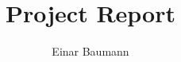 



\author{Einar Baumann}
\title{Project Report}



\maketitle

\clearpage
\tableofcontents

\clearpage
\listoffigures

\clearpage


\clearpage
\printnomenclature
\printnoidxglossaries

\clearpage
{}



